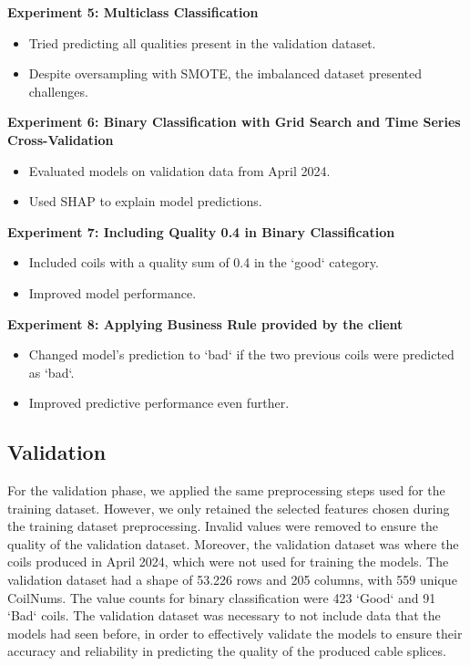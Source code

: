 \textbf{Experiment 5: Multiclass Classification}
\begin{itemize}
    \item Tried predicting all qualities present in the validation dataset.
    \item Despite oversampling with SMOTE, the imbalanced dataset presented challenges.
\end{itemize}

\textbf{Experiment 6: Binary Classification with Grid Search and Time Series Cross-Validation}
\begin{itemize}
    \item Evaluated models on validation data from April 2024.
    \item Used SHAP to explain model predictions.
\end{itemize}

\textbf{Experiment 7: Including Quality 0.4 in Binary Classification}
\begin{itemize}
    \item Included coils with a quality sum of 0.4 in the `good` category.
    \item Improved model performance.
\end{itemize}

\textbf{Experiment 8: Applying Business Rule provided by the client}
\begin{itemize}
    \item Changed model's prediction to `bad` if the two previous coils were predicted as
          `bad`.
    \item Improved predictive performance even further.
\end{itemize}

\subsection{Validation}

For the validation phase, we applied the same preprocessing steps used for the
training dataset. However, we only retained the selected features chosen during
the training dataset preprocessing. Invalid values were removed to ensure the
quality of the validation dataset. Moreover, the validation dataset was where
the coils produced in April 2024, which were not used for training the models.
The validation dataset had a shape of 53.226 rows and 205 columns, with 559
unique CoilNums. The value counts for binary classification were 423 `Good` and
91 `Bad` coils. The validation dataset was necessary to not include data that
the models had seen before, in order to effectively validate the models to
ensure their accuracy and reliability in predicting the quality of the produced
cable splices.

